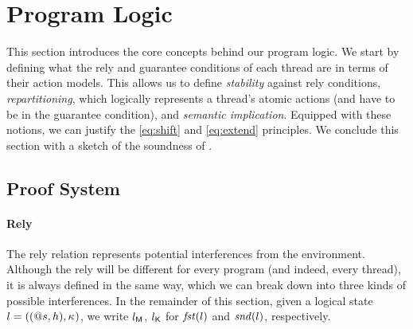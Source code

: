 \vspace{-.5ex}
\section{\colosl Program Logic}
\vspace{-.5ex}
\label{sec:semantics}

This section introduces the core concepts behind our program logic. We
start by defining what the rely and guarantee conditions of each
thread are in terms of their action models. This allows us to define
\emph{stability} against rely conditions, \emph{repartitioning},
which logically represents a thread's atomic actions (and have to be in
the guarantee condition), and \emph{semantic implication}. Equipped
with these notions, we can justify the \eqref{eq:shift} and
\eqref{eq:extend} principles. We conclude this section with a sketch
of the soundness of \colosl.

\vspace{-.5ex}
\subsection{Proof System}
\vspace{-.5ex}

\paragraph{Rely}
The rely relation represents potential interferences from the
environment. Although the rely will be different for every program
(and indeed, every thread), it is always defined in the same way,
which we can break down into three kinds of possible interferences. In
the remainder of this section, given a logical state $l =
((@s,h),\kappa_{})$, we write $l_{\textsf{M}}$, $l_{\textsf{K}}$ for
$\mathit{fst}(l)$ and $\mathit{snd}(l)$, respectively.

